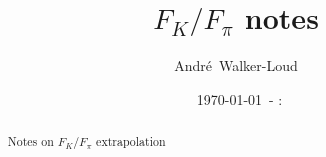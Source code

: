 \documentclass[prd,11pt,tightenlines,preprintnumbers,showpacs,superscriptaddress,notitlepage,nofootinbib,eqsecnum,floatfix,longbibliography]{revtex4-1}
\newcommand{\mydate}{\ \today \ - \number\hour :\number\minute}
\begin{document}
\title{$F_K / F_\pi$ notes}




%
%
%
%
%
%
%
%
%
%
%

\author{Andr\'{e}~Walker-Loud}

\date{\mydate}

\begin{abstract}
Notes on $F_K/F_\pi$ extrapolation
\end{abstract}
\maketitle

\end{document}
